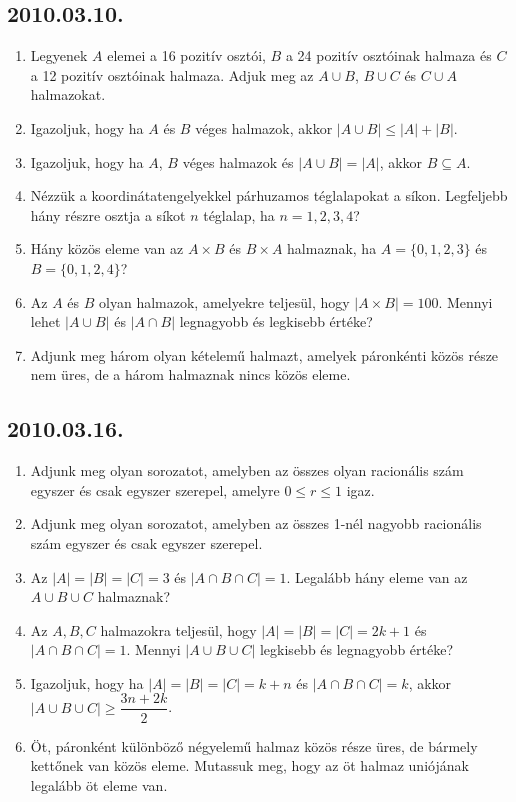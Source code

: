 \subsection*{2010.03.10.}
\begin{enumerate}
\item Legyenek $A$ elemei a 16 pozitív osztói, $B$ a 24 pozitív osztóinak halmaza és $C$ a 12 pozitív osztóinak halmaza. Adjuk meg az $A\cup B$, $B\cup C$ és $C\cup A$ halmazokat.
\item Igazoljuk, hogy ha $A$ és $B$ véges halmazok, akkor $|A\cup B|\le |A|+|B|$.
\item Igazoljuk, hogy ha $A$, $B$ véges halmazok és $|A\cup B|=|A|$, akkor 
$B\subseteq A$. 
\item Nézzük a koordinátatengelyekkel párhuzamos téglalapokat a síkon. Legfeljebb hány részre osztja a síkot $n$ téglalap, ha $n=1, 2, 3, 4$?
\item Hány közös eleme van az $A\times B$ és $B\times A$ halmaznak, ha 
$A=\{0,1,2,3\}$ és $B=\{0,1,2,4\}$?
\item Az $A$ és $B$ olyan halmazok, amelyekre teljesül, hogy $|A\times B|=100$. Mennyi lehet $|A\cup B|$ és $|A\cap B|$ legnagyobb és legkisebb értéke? 
\item Adjunk meg három olyan kételemű halmazt, amelyek páronkénti közös része nem üres, de a három halmaznak nincs közös eleme.
\end{enumerate}
\subsection*{2010.03.16.}
\begin{enumerate}
\item  Adjunk meg olyan sorozatot, amelyben az összes olyan racionális szám egyszer és csak egyszer szerepel, amelyre $0\le r \le 1$ igaz.
\item Adjunk meg olyan sorozatot, amelyben az összes 1-nél nagyobb racionális szám egyszer és csak egyszer szerepel.
\item Az $|A|=|B|=|C|=3$ és $|A\cap B\cap C|=1$. Legalább hány eleme van az $A\cup B\cup C$ halmaznak?
\item Az $A,B,C$ halmazokra teljesül, hogy $|A|=|B|=|C|=2k+1$ és $|A\cap B\cap C|=1$. Mennyi $|A\cup B\cup C|$ legkisebb és legnagyobb értéke?
\item Igazoljuk, hogy ha $|A|=|B|=|C|=k+n$ és $|A\cap B\cap C|=k$, akkor 
$|A\cup B\cup C|\ge\dfrac{3n+2k}{2}$.
\item Öt, páronként különböző négyelemű halmaz közös része üres, de bármely kettőnek van közös eleme. Mutassuk meg, hogy az öt halmaz uniójának legalább öt eleme van.
\end{enumerate}
